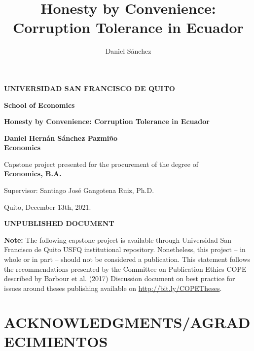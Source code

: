 \documentclass[floatsintext,man]{apa7}\usepackage[]{graphicx}\usepackage[]{color}
\title{Honesty by Convenience: Corruption Tolerance in Ecuador}
\author{Daniel Sánchez}
\date{}
\begin{document}
\justifying



\begin{titlepage}
\centering
{\Large \textbf{UNIVERSIDAD SAN FRANCISCO DE QUITO}}

\vspace{1cm} 
{\large \textbf{School of Economics}}

\vspace{2.5cm}
{\Large \textbf{Honesty by Convenience: Corruption Tolerance in Ecuador}}

\vspace{2cm}
{\Large \textbf{Daniel Hernán Sánchez Pazmiño} \\ \textbf{Economics}}

\vspace{1.5cm}
{\large Capstone project presented for the procurement of the degree of \\ \textbf{Economics, B.A.}}

\vspace{1.5cm}
{\large Supervisor: Santiago José Gangotena Ruiz, Ph.D.}

\vspace{2.5cm}
Quito, December 13th, 2021.
\end{titlepage}
\clearpage

\begin{center}
{\Large \textbf{UNPUBLISHED DOCUMENT}}
\end{center}
\noindent \textbf{Note:} The following capstone project is available through Universidad San Francisco de Quito USFQ institutional repository. Nonetheless, this project – in whole or in part – should not be considered a publication. This statement follows the recommendations presented by the Committee on Publication Ethics COPE described by Barbour et al. (2017) Discussion document on best practice for issues around theses publishing available on \href{http://bit.ly/COPETheses}{http://bit.ly/COPETheses}.

\clearpage



\section*{ACKNOWLEDGMENTS/AGRADECIMIENTOS}
\end{document}
